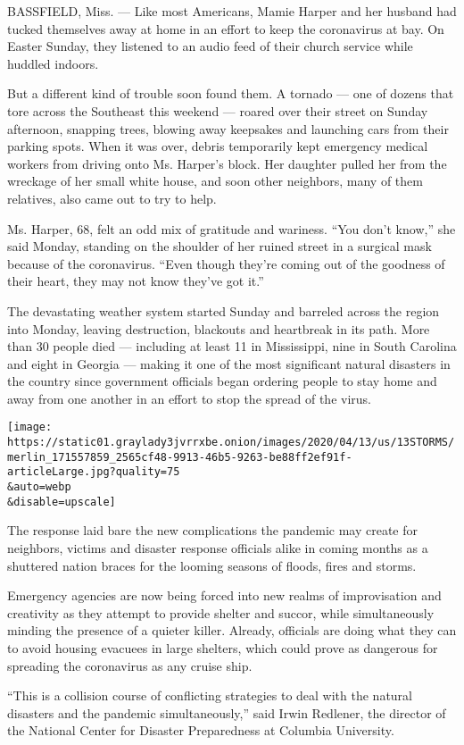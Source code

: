 BASSFIELD, Miss. --- Like most Americans, Mamie Harper and her husband
had tucked themselves away at home in an effort to keep the coronavirus
at bay. On Easter Sunday, they listened to an audio feed of their church
service while huddled indoors.

But a different kind of trouble soon found them. A tornado --- one of
dozens that tore across the Southeast this weekend --- roared over their
street on Sunday afternoon, snapping trees, blowing away keepsakes and
launching cars from their parking spots. When it was over, debris
temporarily kept emergency medical workers from driving onto Ms.
Harper's block. Her daughter pulled her from the wreckage of her small
white house, and soon other neighbors, many of them relatives, also came
out to try to help.

Ms. Harper, 68, felt an odd mix of gratitude and wariness. ``You don't
know,'' she said Monday, standing on the shoulder of her ruined street
in a surgical mask because of the coronavirus. ``Even though they're
coming out of the goodness of their heart, they may not know they've got
it.''

The devastating weather system started Sunday and barreled across the
region into Monday, leaving destruction, blackouts and heartbreak in its
path. More than 30 people died --- including at least 11 in Mississippi,
nine in South Carolina and eight in Georgia --- making it one of the
most significant natural disasters in the country since government
officials began ordering people to stay home and away from one another
in an effort to stop the spread of the virus.

\texttt{[image: https://static01.graylady3jvrrxbe.onion/images/2020/04/13/us/13STORMS/merlin\_171557859\_2565cf48-9913-46b5-9263-be88ff2ef91f-articleLarge.jpg?quality=75\\\&auto=webp\\\&disable=upscale]}

The response laid bare the new complications the pandemic may create for
neighbors, victims and disaster response officials alike in coming
months as a shuttered nation braces for the looming seasons of floods,
fires and storms.

Emergency agencies are now being forced into new realms of improvisation
and creativity as they attempt to provide shelter and succor, while
simultaneously minding the presence of a quieter killer. Already,
officials are doing what they can to avoid housing evacuees in large
shelters, which could prove as dangerous for spreading the coronavirus
as any cruise ship.

``This is a collision course of conflicting strategies to deal with the
natural disasters and the pandemic simultaneously,'' said Irwin
Redlener, the director of the National Center for Disaster Preparedness
at Columbia University.

